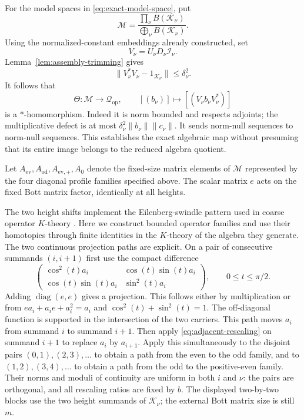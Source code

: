 For the model spaces in \eqref{eq:exact-model-space}, put
\[
 \mathcal M=\frac{\prod_\nu B(\mathscr K_\nu)}
                  {\bigoplus_\nu B(\mathscr K_\nu)}.
\]
Using the normalized-constant embeddings already constructed, set
\[
 V_\nu=U_\nu D_\nu\mathcal I_\nu.
\]
Lemma~\ref{lem:assembly-trimming} gives
\begin{equation}\label{eq:model-map-near-isometry}
 \|V_\nu^*V_\nu-1_{\mathscr K_\nu}\|\le\delta_\nu^2.
\end{equation}
It follows that
\begin{equation}\label{eq:model-quotient-map}
 \Theta\colon\mathcal M\longrightarrow\mathcal Q_{\mathrm{op}},
 \qquad [(b_\nu)]\longmapsto[(V_\nu b_\nu V_\nu^*)]
\end{equation}
is a $*$-homomorphism.  Indeed it is norm bounded and respects adjoints;
the multiplicative defect is at most
$\delta_\nu^2\|b_\nu\|\|c_\nu\|$.  It sends norm-null sequences to
norm-null sequences.  This establishes the exact algebraic map without
presuming that its entire image belongs to the reduced algebra quotient.

Let $A_{\mathrm{ev}},A_{\mathrm{od}},A_{\mathrm{ev},+},A_0$ denote the
fixed-size matrix elements of $\mathcal M$ represented by the four
diagonal profile families specified above.  The scalar matrix $e$ acts on
the fixed Bott matrix factor, identically at all heights.

The two height shifts implement the Eilenberg-swindle pattern used in coarse
operator $K$-theory \cite[Section~10]{HPR97}.  Here we construct bounded
operator families and use their homotopies through finite identities in
the $K$-theory of the algebra they generate.
The two continuous projection paths are explicit.
On a pair of consecutive summands $(i,i+1)$ first use the compact difference
\begin{equation}\label{eq:model-pair-rotation}
 \begin{pmatrix}
  \cos^2(t)a_i&\cos(t)\sin(t)a_i\\
  \cos(t)\sin(t)a_i&\sin^2(t)a_i
 \end{pmatrix},\qquad 0\le t\le\pi/2.
\end{equation}
Adding $\operatorname{diag}(e,e)$ gives a projection.  This follows either
by multiplication or from $ea_i+a_ie+a_i^2=a_i$ and
$\cos^2(t)+\sin^2(t)=1$.  The off-diagonal function is supported in the
intersection of the two carriers.  This path moves $a_i$ from summand $i$
to summand $i+1$.  Then apply \eqref{eq:adjacent-rescaling} on summand
$i+1$ to replace $a_i$ by $a_{i+1}$.  Apply this simultaneously to the
disjoint pairs $(0,1),(2,3),\ldots$ to obtain a path from the even to the
odd family, and to $(1,2),(3,4),\ldots$ to obtain a path from the odd to the
positive-even family.  Their norms and moduli of continuity are uniform in
both $i$ and $\nu$: the pairs are orthogonal, and all rescaling ratios are
fixed by $b$.
The displayed two-by-two blocks use the two height summands of
$\mathscr K_\nu$; the external Bott matrix size is still $m$.

